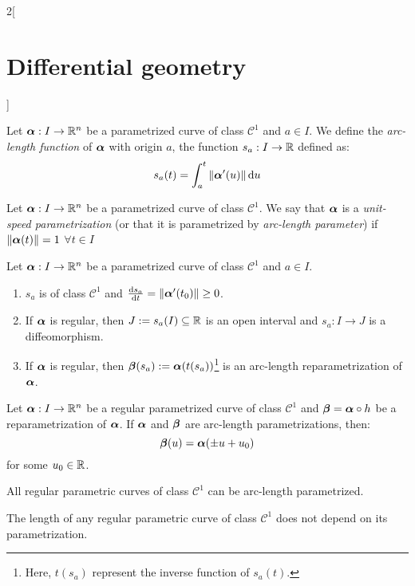 \documentclass[../../../main.tex]{subfiles}
\begin{document}
\begin{multicols}{2}[\section{Differential geometry}]
\begin{proposition}
  \end{proposition}
  \begin{definition}
    Let $\boldsymbol{\mathrm{\alpha}}:I\rightarrow\mathbb{R}^n$ be a parametrized curve of class $\mathcal{C}^1$ and $a\in I$. We define the \emph{arc-length function} of $\boldsymbol{\mathrm{\alpha}}$ with origin $a$, the function $s_a:I\rightarrow\mathbb{R}$ defined as: $$s_a(t)=\int_a^t\|\boldsymbol{\mathrm{\alpha}}'(u)\|\dd{u}$$
  \end{definition}
  \begin{definition}
    Let $\boldsymbol{\mathrm{\alpha}}:I\rightarrow\mathbb{R}^n$ be a parametrized curve of class $\mathcal{C}^1$. We say that $\boldsymbol{\mathrm{\alpha}}$ is a \emph{unit-speed parametrization} (or that it is parametrized by \emph{arc-length parameter}) if $\|\boldsymbol{\mathrm{\alpha}}(t)\|=1$ $\forall t\in I$
  \end{definition}
  \begin{proposition}
    Let $\boldsymbol{\mathrm{\alpha}}:I\rightarrow\mathbb{R}^n$ be a parametrized curve of class $\mathcal{C}^1$ and $a\in I$.
    \begin{enumerate}
      \item $s_a$ is of class $\mathcal{C}^1$ and $\dv{s_a}{t}(t_0)=\|\boldsymbol{\mathrm{\alpha}}'(t_0)\|\geq 0$.
      \item If $\boldsymbol{\mathrm{\alpha}}$ is regular, then $J:=s_a(I)\subseteq\mathbb{R}$ is an open interval and $s_a:I\rightarrow J$ is a diffeomorphism.
      \item If $\boldsymbol{\mathrm{\alpha}}$ is regular, then $\boldsymbol{\mathrm{\beta}}(s_a):=\boldsymbol{\mathrm{\alpha}}(t(s_a))$\footnote{Here, $t(s_a)$ represent the inverse function of $s_a(t)$.} is an arc-length reparametrization of $\boldsymbol{\mathrm{\alpha}}$.
    \end{enumerate}
  \end{proposition}
  \begin{proposition}
    Let $\boldsymbol{\mathrm{\alpha}}:I\rightarrow\mathbb{R}^n$ be a regular parametrized curve of class $\mathcal{C}^1$ and $\boldsymbol{\mathrm{\beta}}=\boldsymbol{\mathrm{\alpha}}\circ h$ be a reparametrization of $\boldsymbol{\mathrm{\alpha}}$. If $\boldsymbol{\mathrm{\alpha}}$ and $\boldsymbol{\mathrm{\beta}}$ are arc-length parametrizations, then: $$\boldsymbol{\mathrm{\beta}}(u)=\boldsymbol{\mathrm{\alpha}}(\pm u+u_0)$$ for some $u_0\in\mathbb{R}$.
  \end{proposition}
  \begin{proposition}
    All regular parametric curves of class $\mathcal{C}^1$ can be arc-length parametrized.
  \end{proposition}
  \begin{proposition}
    The length of any regular parametric curve of class $\mathcal{C}^1$ does not depend on its parametrization.
  \end{proposition}

\end{multicols}
\end{document}
